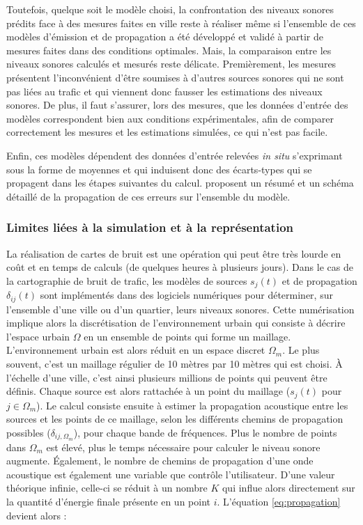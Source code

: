 Toutefois, quelque soit le modèle choisi, la confrontation des niveaux sonores prédits face à des mesures faites en ville reste à réaliser même si l'ensemble de ces modèles d'émission et de propagation a été développé et validé à partir de mesures faites dans des conditions optimales. Mais, la comparaison entre les niveaux sonores calculés et mesurés reste délicate. Premièrement, les mesures présentent l'inconvénient d'être soumises à d'autres sources sonores qui ne sont pas liées au trafic et qui viennent donc fausser les estimations des niveaux sonores. De plus, il faut s'assurer, lors des mesures, que les données d'entrée des modèles correspondent bien aux conditions expérimentales, afin de comparer correctement les mesures et les estimations simulées, ce qui n'est pas facile.

Enfin, ces modèles dépendent des données d'entrée relevées \textit{in situ} s'exprimant sous la forme de moyennes et qui induisent donc des écarts-types qui se propagent dans les étapes suivantes du calcul. \cite{van_leeuwen_noise_2015} proposent un résumé et un schéma détaillé de la propagation de ces erreurs sur l'ensemble du modèle.

\subsubsection{Limites liées à la simulation et à la représentation}

La réalisation de cartes de bruit est une opération qui peut être très lourde en coût et en temps de calculs (de quelques heures à plusieurs jours).
Dans le cas de la cartographie de bruit de trafic, les modèles de sources $s_j(t)$ et de propagation $\delta_{ij}(t)$ sont implémentés dans des logiciels numériques pour déterminer, sur l'ensemble d'une ville ou d'un quartier, leurs niveaux sonores. Cette numérisation implique alors la discrétisation de l'environnement urbain qui consiste à décrire l'espace urbain $\Omega$ en un ensemble de points qui forme un maillage. L'environnement urbain est alors réduit en un espace discret $\Omega_m$. Le plus souvent, c'est un maillage régulier de 10 mètres par 10 mètres qui est choisi. À l'échelle d'une ville, c'est ainsi plusieurs millions de points qui peuvent être définis. Chaque source est alors rattachée à un point du maillage ($s_{j}(t)$ pour $j\in\Omega_m$). Le calcul consiste ensuite à estimer la propagation acoustique entre les sources et les points de ce maillage, selon les différents chemins de propagation possibles ($\delta_{ij,\Omega_m}$), pour chaque bande de fréquences. Plus le nombre de points dans $\Omega_{m}$ est élevé, plus le temps nécessaire pour calculer le niveau sonore augmente.  
Également, le nombre de chemins de propagation d'une onde acoustique est également une variable que contrôle l'utilisateur. D'une valeur théorique infinie, celle-ci se réduit à un nombre $K$ qui influe alors directement sur la quantité d'énergie finale présente en un point $i$. L'équation \ref{eq:propagation} devient alors : 

